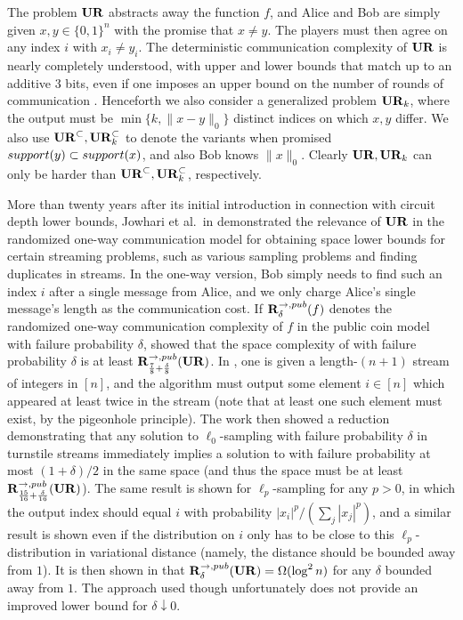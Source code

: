 The problem $\mathbf{UR}$ abstracts away the function $f$, and Alice and Bob are simply given $x,y\in\{0,1\}^n$ with the promise that $x\neq y$. The players must then agree on any index $i$ with $x_i\neq y_i$. The deterministic communication complexity of $\mathbf{UR}$ is nearly completely understood, with upper and lower bounds that match up to an additive $3$ bits, even if one imposes an upper bound on the number of rounds of communication \cite{TardosZ97}. Henceforth we also consider a generalized problem $\mathbf{UR}_k$, where the output must be $\min\{k, \|x-y\|_0\}$ distinct indices on which $x, y$ differ. We also use $\mathbf{UR}^{\subset}, \mathbf{UR}_k^{\subset}$ to denote the variants when promised $\mathop{support}(y)\subset \mathop{support}(x)$, and also Bob knows $\|x\|_0$. Clearly $\mathbf{UR}, \mathbf{UR}_k$ can only be harder than $\mathbf{UR}^\subset, \mathbf{UR}_k^\subset$, respectively.

More than twenty years after its initial introduction in connection with circuit depth lower bounds, Jowhari et al.\ in \cite{JowhariST11} demonstrated the relevance of $\mathbf{UR}$ in the randomized one-way communication model for obtaining space lower bounds for certain streaming problems, such as various sampling problems and finding duplicates in streams. In the one-way version, Bob simply needs to find such an index $i$ after a single message from Alice, and we only charge Alice's single message's length as the communication cost. If $\mathbf{R}^{\rightarrow,pub}_\delta(f)$ denotes the randomized one-way communication complexity of $f$ in the public coin model with failure probability $\delta$, \cite{JowhariST11} showed that the space complexity of  with failure probability $\delta$ is at least $\mathbf{R}^{\rightarrow,pub}_{\frac 78 + \frac{\delta}8}(\mathbf{UR})$. In , one is given a length-$(n+1)$ stream of integers in $[n]$, and the algorithm must output some element $i\in[n]$ which appeared at least twice in the stream (note that at least one such element must exist, by the pigeonhole principle). The work \cite{JowhariST11} then showed a reduction demonstrating that any solution to $\ell_0$-sampling with failure probability $\delta$ in turnstile streams immediately implies a solution to  with failure probability at most $(1+\delta)/2$ in the same space (and thus the space must be at least $\mathbf{R}^{\rightarrow,pub}_{\frac{15}{16} + \frac{\delta}{16}}(\mathbf{UR})$). The same result is shown for $\ell_p$-sampling for any $p>0$, in which the output index should equal $i$ with probability $|x_i|^p/(\sum_j |x_j|^p)$, and a similar result is shown even if the distribution on $i$ only has to be close to this $\ell_p$-distribution in variational distance (namely, the distance should be bounded away from $1$). It is then shown in \cite{JowhariST11} that $\mathbf{R}^{\rightarrow,pub}_\delta(\mathbf{UR}) = \Omega(\log^2 n)$ for any $\delta$ bounded away from $1$. The approach used though unfortunately does not provide an improved lower bound for $\delta\downarrow 0$.

